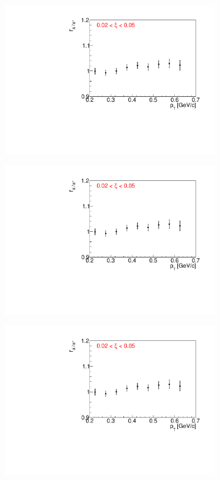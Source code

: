 \begin{figure}[h!]
\begin{subfigure}{.32\textwidth}
		\includegraphics[width=\linewidth, page=12]{chapters/chrgSTAR/img/dEdx/fit2019_fitResult_0_0_step_0.pdf}
	\end{subfigure}
	\begin{subfigure}{.32\textwidth}
		\includegraphics[width=\linewidth, page=15]{chapters/chrgSTAR/img/dEdx/fit2019_fitResult_0_0_step_0.pdf}
	\end{subfigure}
	\begin{subfigure}{.32\textwidth}
		\includegraphics[width=\linewidth, page=16]{chapters/chrgSTAR/img/dEdx/fit2019_fitResult_0_0_step_0.pdf}

\end{subfigure}
\end{figure}
